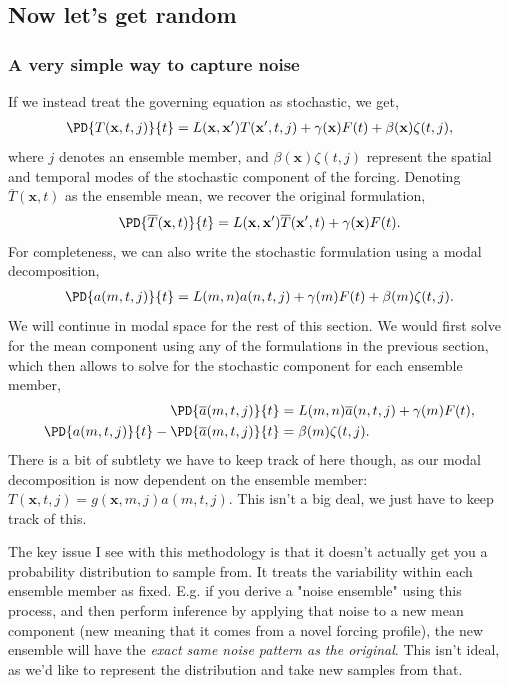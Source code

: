 \subsection{Now let's get random}
\subsubsection{A very simple way to capture noise}
If we instead treat the governing equation as stochastic, we get,
\begin{align}
  \PD{T(\mathbf{x},t,j)}{t} = L(\mathbf{x},\mathbf{x}')T(\mathbf{x}',t,j) + \gamma(\mathbf{x})F(t) + \beta(\mathbf{x})\zeta(t,j),
\end{align}
where $j$ denotes an ensemble member, and $\beta(\mathbf{x})\zeta(t,j)$ represent the spatial and temporal modes of the stochastic component of the forcing. Denoting $\overline{T}(\mathbf{x},t)$ as the ensemble mean, we recover the original formulation,
\begin{align}
  \PD{\overline{T}(\mathbf{x},t)}{t} = L(\mathbf{x},\mathbf{x}')\overline{T}(\mathbf{x}',t) + \gamma(\mathbf{x})F(t).
\end{align}
For completeness, we can also write the stochastic formulation using a modal decomposition,
\begin{align}
  \PD{a(m,t,j)}{t} = L(m,n)a(n,t,j) + \gamma(m)F(t) + \beta(m)\zeta(t,j).
\end{align}
We will continue in modal space for the rest of this section. We would first solve for the mean component using any of the formulations in the previous section, which then allows to solve for the stochastic component for each ensemble member, 
\begin{align}
  \PD{\overline{a}(m,t,j)}{t} &= L(m,n)\overline{a}(n,t,j) + \gamma(m)F(t), \\
  \PD{a(m,t,j)}{t} - \PD{\overline{a}(m,t,j)}{t} &= \beta(m)\zeta(t,j).
\end{align}
There is a bit of subtlety we have to keep track of here though, as our modal decomposition is now dependent on the ensemble member: $T(\mathbf{x},t,j) = g(\mathbf{x},m,j)a(m,t,j)$. This isn't a big deal, we just have to keep track of this.

The key issue I see with this methodology is that it doesn't actually get you a probability distribution to sample from. It treats the variability within each ensemble member as fixed. E.g. if you derive a "noise ensemble" using this process, and then perform inference by applying that noise to a new mean component (new meaning that it comes from a novel forcing profile), the new ensemble will have the \textit{exact same noise pattern as the original}. This isn't ideal, as we'd like to represent the distribution and take new samples from that.

